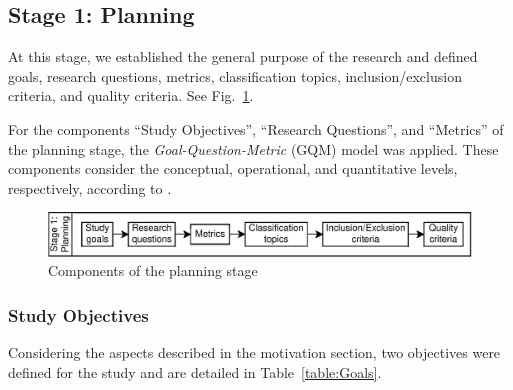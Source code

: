 \subsection{Stage 1: Planning}\label{sec:planeacion}

At this stage, we established the general purpose of the research and defined goals, research questions, metrics, classification topics, inclusion/exclusion criteria, and quality criteria. See Fig.~\ref{fig:PlanningStageOverview}.

For the components ``Study Objectives'', ``Research Questions'', and ``Metrics'' of the planning stage, the {\itshape Goal-Question-Metric} (GQM) model \cite{basili1992software, caldiera1994goal} was applied. These components consider the conceptual, operational, and quantitative levels, respectively, according to \cite{Sepúlveda202141}.


\begin{figure}
	\centering
	\includegraphics[scale=1.0]{resources/figures/sms-Etapa-1.eps}
	\caption{Components of the planning stage}
	\label{fig:PlanningStageOverview}
\end{figure}

\subsubsection{Study Objectives}
Considering the aspects described in the motivation section, two objectives were defined for the study and are detailed in Table~\ref{table:Goals}.

